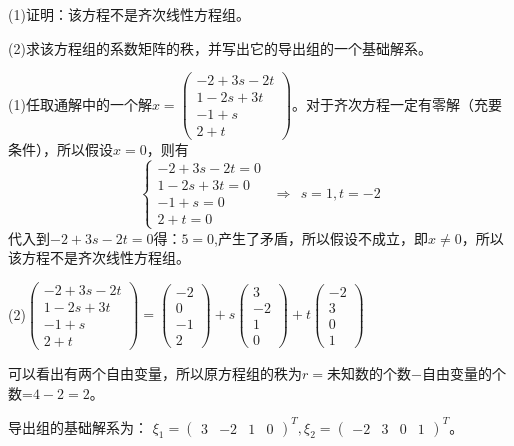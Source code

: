 \documentclass[a4paper]{report}
\begin{document}
(1)证明：该方程不是齐次线性方程组。

(2)求该方程组的系数矩阵的秩，并写出它的导出组的一个基础解系。

\begin{jie}
(1)任取通解中的一个解$x
=\begin{pmatrix}
-2+3s-2t\\
1-2s+3t\\
-1+s\\
2+t
\end{pmatrix}
$。对于齐次方程一定有零解（充要条件），所以假设$x=0$，则有
\begin{equation*}
\begin{cases}
-2+3s-2t=0\\
1-2s+3t=0\\
-1+s=0\\
2+t=0
\end{cases}~~\Rightarrow ~~s=1,t=-2
\end{equation*}
代入到$-2+3s-2t=0$得：$5=0$,产生了矛盾，所以假设不成立，即$x\neq 0$，所以该方程不是齐次线性方程组。

(2)$\begin{pmatrix}
-2+3s-2t\\
1-2s+3t\\
-1+s\\
2+t
\end{pmatrix}=
\begin{pmatrix}
-2\\ 0\\ -1\\ 2
\end{pmatrix}+s\begin{pmatrix}
3\\ -2\\ 1\\ 0
\end{pmatrix}+t\begin{pmatrix}
-2\\ 3\\ 0\\ 1
\end{pmatrix}
$

可以看出有两个自由变量，所以原方程组的秩为$r=$未知数的个数$-$自由变量的个数=$4-2=2$。

导出组的基础解系为：
$\xi_1=\begin{pmatrix}
3& -2& 1& 0
\end{pmatrix}^T,\xi_2=\begin{pmatrix}
-2& 3&0&1
\end{pmatrix}^T$。
\end{jie}
\end{document}
